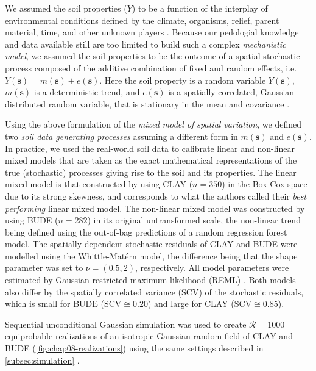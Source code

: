 We assumed the soil properties ($Y$) to be a function of the interplay of environmental conditions defined by 
the climate, organisms, relief, parent material, time, and other unknown players \cite{Jenny1941, 
McBratneyEtAl2003, Florinsky2012}. Because our pedologial knowledge and data available still are too limited 
to build such a complex \emph{mechanistic model}, we assumed the soil properties to be the outcome of a 
spatial stochastic process composed of the additive combination of fixed and random effects, i.e. 
$Y(\boldsymbol{s}) = m(\boldsymbol{s}) + e(\boldsymbol{s})$. Here the soil property is a random variable 
$Y(\boldsymbol{s})$, $m(\boldsymbol{s})$ is a deterministic trend, and $e(\boldsymbol{s})$ is a spatially 
correlated, Gaussian distributed random variable, that is stationary in the mean and covariance 
\cite{HeuvelinkEtAl2001}.

Using the above formulation of the \emph{mixed model of spatial variation}, we defined two \emph{soil 
data generating processes} assuming a different form in $m(\boldsymbol{s})$ and $e(\boldsymbol{s})$. In 
practice, we used the real-world soil data to calibrate linear and non-linear mixed models that are taken as 
the exact mathematical representations of the true (stochastic) processes giving rise to the soil and its 
properties. The linear mixed model is that constructed by \citet{Samuel-RosaEtAl2015} using CLAY ($n = 350$) 
in the Box-Cox space due to its strong skewness, and corresponds to what the authors called their \emph{best 
performing} linear mixed model. The non-linear mixed model was constructed by \citet{Samuel-RosaEtAl2016} 
using BUDE ($n = 282$) in its original untransformed scale, the non-linear trend being defined using the 
out-of-bag predictions of a random regression forest model. The spatially dependent stochastic residuals of 
CLAY and BUDE were modelled using the Whittle-Matérn model, the difference being that the shape parameter was 
set to $\nu = (0.5, 2)$, respectively. All model parameters were estimated by Gaussian restricted maximum 
likelihood (REML) \cite{LarkEtAl2004, DiggleEtAl2007}. Both models also differ by the spatially correlated 
variance (SCV) of the stochastic residuals, which is small for BUDE ($\text{SCV} \cong 0.20$) and large for 
CLAY ($\text{SCV} \cong 0.85$).

Sequential unconditional Gaussian simulation was used to create $\mathcal{R} = 1000$ equiprobable realizations 
of an isotropic Gaussian random field of CLAY and BUDE (\autoref{fig:chap08-realizations}) using the same 
settings described in \autoref{subsec:simulation} \cite{Samuel-RosaEtAl2016}.
 
